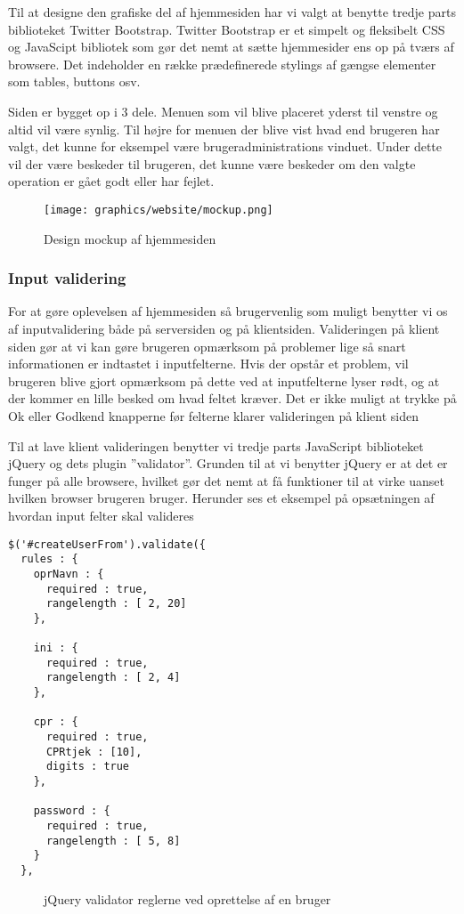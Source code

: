 \documentclass[a4paper]{article}
\newenvironment{changemargin}[2]{%
\begin{list}{}{%
\setlength{\topsep}{0pt}%
\setlength{\leftmargin}{#1}%
\setlength{\rightmargin}{#2}%
\setlength{\listparindent}{\parindent}%
\setlength{\itemindent}{\parindent}%
\setlength{\parsep}{\parskip}%
}%
\item[]}{\end{list}}
\begin{document}
Til at designe den grafiske del af hjemmesiden har vi valgt at benytte tredje parts biblioteket Twitter Bootstrap.  Twitter Bootstrap er et simpelt og fleksibelt CSS og JavaScipt bibliotek som gør det nemt at sætte hjemmesider ens op på tværs af browsere. Det indeholder en række prædefinerede stylings af gængse elementer som tables, buttons osv.

Siden er bygget op i 3 dele. Menuen som vil blive placeret yderst til venstre og altid vil være synlig. Til højre for menuen der blive vist hvad end brugeren har valgt, det kunne for eksempel være brugeradministrations vinduet. Under dette vil der være beskeder til brugeren, det kunne være beskeder om den valgte operation er gået godt eller har fejlet.

\begin{figure}[H]
  \centering
  \texttt{[image: graphics/website/mockup.png]}
  \caption{Design mockup af hjemmesiden}
\end{figure}



\subsubsection{Input validering} %

For at gøre oplevelsen af hjemmesiden så brugervenlig som muligt benytter vi os af inputvalidering både på serversiden og på klientsiden. Valideringen på klient siden gør at vi kan gøre brugeren opmærksom på problemer lige så snart informationen er indtastet i inputfelterne. Hvis der opstår et problem, vil brugeren blive gjort opmærksom på dette ved at inputfelterne lyser rødt, og at der kommer en lille besked om hvad feltet kræver. Det er ikke muligt at trykke på Ok eller Godkend knapperne før felterne klarer valideringen på klient siden

Til at lave klient valideringen benytter vi tredje parts JavaScript biblioteket  jQuery  og dets plugin ”validator”. Grunden til at vi benytter jQuery er at det er funger på alle browsere, hvilket gør det nemt at få funktioner til at virke uanset hvilken browser brugeren bruger. Herunder ses et eksempel på opsætningen af hvordan input felter skal valideres

\begin{lstlisting}
$('#createUserFrom').validate({
  rules : {
    oprNavn : {
      required : true,
      rangelength : [ 2, 20]
    },

    ini : {
      required : true,
      rangelength : [ 2, 4]
    },

    cpr : {
      required : true,
      CPRtjek : [10],
      digits : true
    },
    
    password : {
      required : true,
      rangelength : [ 5, 8]
    }
  },
\end{lstlisting}
\begin{figure}[h!]
  \caption{jQuery validator reglerne ved oprettelse af en bruger}
\end{figure}
\end{document}
